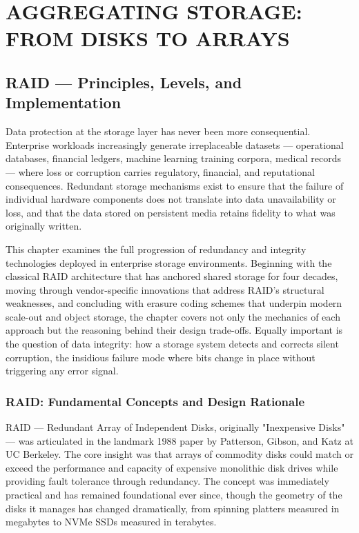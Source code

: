 \part{AGGREGATING STORAGE: FROM DISKS TO ARRAYS}

\chapter{RAID --- Principles, Levels, and Implementation}
\label{ch:5}

Data protection at the storage layer has never been more consequential. Enterprise workloads increasingly generate irreplaceable datasets --- operational databases, financial ledgers, machine learning training corpora, medical records --- where loss or corruption carries regulatory, financial, and reputational consequences. Redundant storage mechanisms exist to ensure that the failure of individual hardware components does not translate into data unavailability or loss, and that the data stored on persistent media retains fidelity to what was originally written.

This chapter examines the full progression of redundancy and integrity technologies deployed in enterprise storage environments. Beginning with the classical RAID architecture that has anchored shared storage for four decades, moving through vendor-specific innovations that address RAID's structural weaknesses, and concluding with erasure coding schemes that underpin modern scale-out and object storage, the chapter covers not only the mechanics of each approach but the reasoning behind their design trade-offs. Equally important is the question of data integrity: how a storage system detects and corrects silent corruption, the insidious failure mode where bits change in place without triggering any error signal.

\section{RAID: Fundamental Concepts and Design Rationale}
RAID --- Redundant Array of Independent Disks, originally "Inexpensive Disks" --- was articulated in the landmark 1988 paper by Patterson, Gibson, and Katz at UC Berkeley. The core insight was that arrays of commodity disks could match or exceed the performance and capacity of expensive monolithic disk drives while providing fault tolerance through redundancy. The concept was immediately practical and has remained foundational ever since, though the geometry of the disks it manages has changed dramatically, from spinning platters measured in megabytes to NVMe SSDs measured in terabytes.

